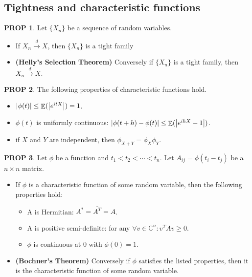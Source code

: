 \documentclass[hidelinks,11pt]{article}
\theoremstyle{definition}
\theoremstyle{dotless}
\newtheorem{prop}{PROP}[section]
\theoremstyle{remark}
\DeclareMathOperator{\E}{\mathbb{E}}
\DeclareMathOperator{\1}{\mathbf{1}}
\begin{document}
\subsection{Tightness and characteristic functions}

\begin{prop}
Let $\{X_n\}$ be a sequence of random variables.\begin{itemize}
    \item If $X_n\xrightarrow{d}X$, then $\{X_n\}$ is a tight family
    \item \textup{\textbf{(Helly's Selection Theorem)}} Conversely if $\{X_n\}$ is a tight family, then $X_n\xrightarrow{d}X$.
\end{itemize}
\end{prop}

\begin{prop}
The following properties of characteristic functions hold.
\begin{itemize}
    \item $\abs{\phi(t)}\leq\E(\abs{e^{itX}})=1$.
    \item $\phi(t)$ is uniformly continuous: $\abs{\phi(t+h)-\phi(t)}\leq\E(\abs{e^{ihX}-1})$.
    \item if $X$ and $Y$ are independent, then $\phi_{X+Y}=\phi_X\phi_Y$.
\end{itemize}
\end{prop}

\begin{prop}
Let $\phi$ be a function and $t_1<t_2<\cdots<t_n$. Let $A_{ij}=\phi(t_i-t_j)$ be a $n\times n$ matrix.\begin{itemize}
    \item If $\phi$ is a characteristic function of some random variable, then the following properties hold:\begin{itemize}
        \item A is Hermitian: $A^*=\overline{A^T}=A$.
        \item A is positive semi-definite: for any $\forall v\in\mathbb{C}^n:v^TAv\geq0$.
        \item $\phi$ is continuous at 0 with $\phi(0)=1$.
    \end{itemize}
    \item \textup{\textbf{(Bochner's Theorem)}} Conversely if $\phi$ satisfies the listed properties, then it is the characteristic function of some random variable.
\end{itemize}
\end{prop}
\end{document}
